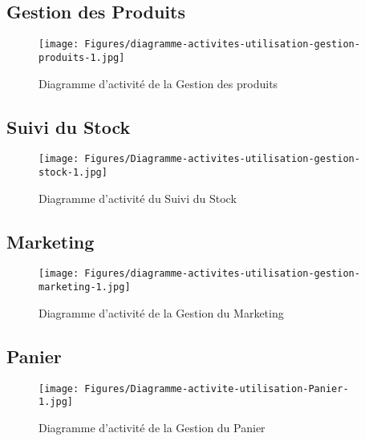 \vspace{.5cm}
\subsection{Gestion des Produits}
\vspace{.5cm}

\begin{figure}[H]
    \centering
    \texttt{[image: Figures/diagramme-activites-utilisation-gestion-produits-1.jpg]}
    \caption{Diagramme d'activité de la Gestion des produits}
\end{figure}


\vspace{.5cm}
\subsection{Suivi du Stock}
\vspace{.5cm}

\begin{figure}[H]
    \centering
    \texttt{[image: Figures/Diagramme-activites-utilisation-gestion-stock-1.jpg]}
    \caption{Diagramme d'activité du Suivi du Stock}
\end{figure}

\vspace{.5cm}
\subsection{Marketing}
\vspace{.5cm}

\begin{figure}[H]
    \centering
    \texttt{[image: Figures/diagramme-activites-utilisation-gestion-marketing-1.jpg]}
    \caption{Diagramme d'activité de la Gestion du Marketing}
\end{figure}


\vspace{.5cm}
\subsection{Panier}
\vspace{.5cm}

\begin{figure}[H]
    \centering
    \texttt{[image: Figures/Diagramme-activite-utilisation-Panier-1.jpg]}
    \caption{Diagramme d'activité de la Gestion du Panier}
\end{figure}

